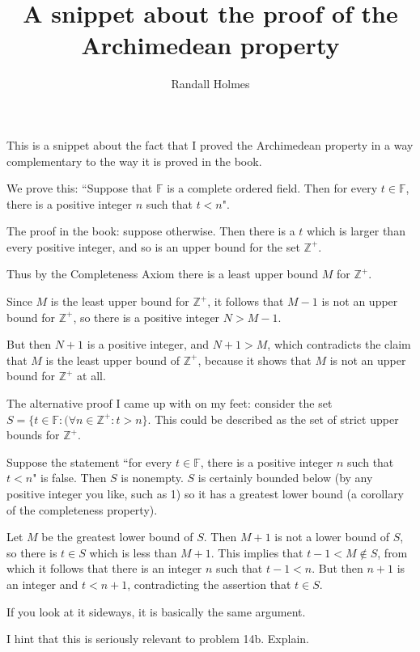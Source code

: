 \documentclass[12pt]{article}
\title{A snippet about the proof of the Archimedean property}
\author{Randall Holmes}
\begin{document}
\maketitle

This is a snippet about the fact that I proved the Archimedean property in a way complementary to the way it is proved in the book.

We prove this:  ``Suppose that $\mathbb F$ is a complete ordered field.  Then for every $t \in \mathbb F$, there is a positive integer $n$ such that $t<n$".

The proof in the book:  suppose otherwise.  Then there is a $t$ which is larger than every positive integer, and so is an upper bound for the set $\mathbb Z^+$.

Thus by the Completeness Axiom there is a least upper bound $M$ for $\mathbb Z^+$.

Since $M$ is the least upper bound for $\mathbb Z^+$, it follows that $M-1$ is not an upper bound for $\mathbb Z^+$, so there is a positive integer $N>M-1$.

But then $N+1$ is a positive integer, and $N+1>M$, which contradicts the claim that $M$ is the least upper bound of $\mathbb Z^+$, because it shows that $M$ is not
an upper bound for $\mathbb Z^+$ at all.

The alternative proof I came up with on my feet:  consider the set $S = \{t \in {\mathbb F}:(\forall n \in \mathbb Z^+:t>n\}$.  This could be described as the set of strict upper bounds
for $\mathbb Z^+$.

Suppose the statement ``for every $t \in \mathbb F$, there is a positive integer $n$ such that $t<n$" is false.  Then $S$ is nonempty.  $S$ is certainly bounded below
(by any positive integer you like, such as 1) so it has a greatest lower bound (a corollary of the completeness property).

Let $M$ be the greatest lower bound of $S$.  Then $M+1$ is not a lower bound of $S$, so there is $t \in S$ which is less than $M+1$.  This implies that $t-1<M \not\in S$, from which it follows that there is an integer $n$ such that $t-1<n$.  But then $n+1$ is an integer and $t<n+1$, contradicting the assertion that $t \in S$.

If you look at it sideways, it is basically the same argument.

I hint that this is seriously relevant to problem 14b.  Explain.
\end{document}
